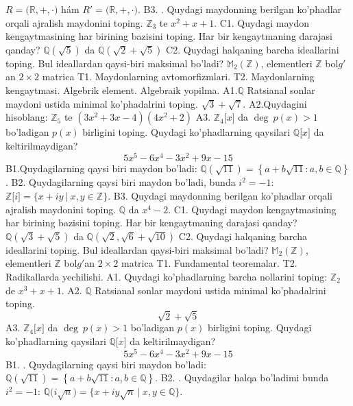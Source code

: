 \(R\mathbb{= (R,} + , \cdot )\) hám \(R'\mathbb{= (R,} + , \cdot )\).
B3. . Quydagi maydonning berilgan ko'phadlar orqali ajralish maydonini toping.
\(\mathbb{Z}_{3}\) te \(x^{2} + x + 1\).
C1. Quydagi maydon kengaytmasining har birining bazisini toping. Har bir kengaytmaning darajasi qanday?
\(\mathbb{Q}\left( \sqrt{5} \right)\) da \(\mathbb{Q}\left( \sqrt{2} + \sqrt{5} \right)\)
C2. Quydagi halqaning barcha ideallarini toping. Bul ideallardan qaysi-biri maksimal bo'ladi?
\(\mathbb{M}_{2}\left( \mathbb{Z} \right)\), elementleri \(\mathbb{Z}\) bol\(g'\)an \(2 \times 2\) matrica
T1. Maydonlarning avtomorfizmlari.
T2. Maydonlarning kengaytmasi. Algebrik element. Algebraik yopilma.
A1.\(\mathbb{Q}\) Ratsianal sonlar maydoni ustida minimal ko'phadalrini toping.
\(\sqrt{3} + \sqrt{7}\).
A2.Quydagini hisoblang:
\(\mathbb{Z}_{5}\) te \(\left( 3x^{2} + 3x - 4 \right)\left( 4x^{2} + 2 \right)\)
A3. \(\mathbb{Z}_{4}\lbrack x\rbrack\) da \(\deg\ p(x) > 1\) bo'ladigan \(p(x)\) birligini toping. Quydagi ko'phadlarning qaysilari \(\mathbb{Q\lbrack}x\rbrack\) da keltirilmaydigan?
\[5x^{5} - 6x^{4} - 3x^{2} + 9x - 15\]
B1.Quydagilarning qaysi biri maydon bo'ladi:
\(\mathbb{Q}\left( \sqrt{11} \right) = \left\{ a + b\sqrt{11}:a,b \in \mathbb{Q} \right\}\).
B2. Quydagilarning qaysi biri maydon bo'ladi, bunda \(i^{2} = - 1\):
\(\mathbb{Z\lbrack}i\rbrack = \{ x + iy\ |\ x,y \in \mathbb{Z\}}\).
B3. Quydagi maydonning berilgan ko'phadlar orqali ajralish maydonini toping.
\(\mathbb{Q}\) da \(x^{4} - 2\).
C1. Quydagi maydon kengaytmasining har birining bazisini toping. Har bir kengaytmaning darajasi qanday?
\(\mathbb{Q}\left( \sqrt{3} + \sqrt{5} \right)\) da \(\mathbb{Q}\left( \sqrt{2},\sqrt{6} + \sqrt{10} \right)\)
C2. Quydagi halqaning barcha ideallarini toping. Bul ideallardan qaysi-biri maksimal bo'ladi?
\(\mathbb{M}_{2}\left( \mathbb{Z} \right)\), elementleri \(\mathbb{Z}\) bol\(g'\)an \(2 \times 2\) matrica
T1. Fundamental teoremalar.
T2. Radikallarda yechilishi.
A1. Quydagi ko'phadlarning barcha nollarini toping:
\(\mathbb{Z}_{2}\) de \(x^{3} + x + 1\).
A2. \(\mathbb{Q}\) Ratsianal sonlar maydoni ustida minimal ko'phadalrini toping.
\[\sqrt{2} + \sqrt{5}\]
A3. \(\mathbb{Z}_{4}\lbrack x\rbrack\) da \(\deg\ p(x) > 1\) bo'ladigan \(p(x)\) birligini toping. Quydagi ko'phadlarning qaysilari \(\mathbb{Q\lbrack}x\rbrack\) da keltirilmaydigan?
\[5x^{5} - 6x^{4} - 3x^{2} + 9x - 15\]
B1. . Quydagilarning qaysi biri maydon bo'ladi:
\(\mathbb{Q}\left( \sqrt{11} \right) = \left\{ a + b\sqrt{11}:a,b \in \mathbb{Q} \right\}\).
B2. . Quydagilar halqa bo'ladimi bunda \(i^{2} = - 1\):
\(\mathbb{Q(}i\sqrt{n}) = \{ x + iy\sqrt{n}\ |\ x,y \in \mathbb{Q\}}\).
